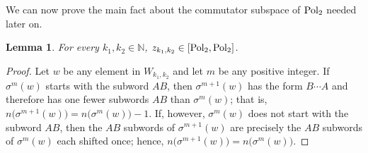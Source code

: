 \documentclass[reqno,10pt,centertags]{amsart}
\newcommand{\bbN}{{\mathbb{N}}}
\newcommand{\lb}{\label}
\numberwithin{equation}{section}
\newtheorem{lemma}[theorem]{Lemma}
\theoremstyle{remark}
\begin{document}
We can now prove the main fact about the commutator  subspace of ${\rm Pol_2}$ needed later on.

\begin{lemma} \lb{lD.4} 
For every $k_1,k_2 \in \bbN$, $z_{k_1,k_2}\in[{\rm Pol_2},{\rm Pol_2}]$.  
\end{lemma}
\begin{proof} 
Let $w$ be any element in $W_{k_1,k_2}$ and let $m$ be any positive integer. 
If $\sigma^m(w)$ starts with the subword $AB$, 
then $\sigma^{m+1}(w)$ has the form $B\cdots A$ and therefore has one fewer subwords $AB$ than $\sigma^m(w)$; 
that is, $n\bigl(\sigma^{m+1}(w)\bigr) = n\bigl(\sigma^m(w)\bigr)-1$.
If, however, $\sigma^m(w)$ does not start with the subword $AB$, 
then the $AB$ subwords of $\sigma^{m+1}(w)$ are precisely the $AB$ subwords of $\sigma^m(w)$ each shifted once; 
hence, $n\bigl(\sigma^{m+1}(w)\bigr) = n\bigl(\sigma^m(w)\bigr)$.


\end{proof}
\end{document}
